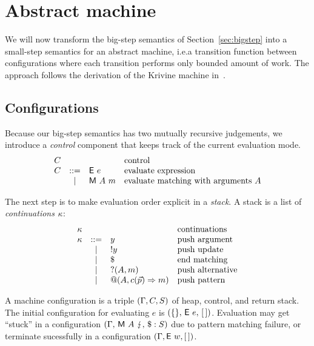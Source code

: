 \section{Abstract machine}\label{sec:smallstep}

We will now transform the big-step semantics of
Section~\ref{sec:bigstep} into a small-step semantics for an abstract
machine, i.e.\@ a transition function between configurations where
each transition performs only bounded amount of work. The approach
follows the derivation of the Krivine machine in~\cite{sestof_1997}.

\subsection{Configurations}
Because our big-step semantics has two mutually recursive judgements,
we introduce a \emph{control} component that keeps
track of the current evaluation mode.
\[ \begin{array}{lcll}
     C & && \text{control} \\
     C &::=& \textsf{E}~e & \text{evaluate expression}\\
     &\mid& \textsf{M}~A~m & \text{evaluate matching with arguments}~A 
\end{array} \]

The next step is to make evaluation order explicit 
in a \emph{stack}.  A stack is a list of \emph{continuations} $\kappa$:
\[ \begin{array}{lcll}
     \kappa &&& \text{continuations} \\
     \kappa &::=& y & \text{push argument} \\
           &\mid& !y & \text{push update} \\
           &\mid& \$ & \text{end matching} \\
           &\mid& ?(A,m) & \text{push alternative} \\
           &\mid& @(A,c(\vec{p}) \Rightarrow m) & \text{push pattern}
   \end{array}
   \]

A machine configuration is a triple
$(\Gamma,C,S)$ of heap, control, 
and return stack.  The initial configuration for evaluating $e$ is
$(\{\},\, \textsf{E}~e,\, [\,])$.  Evaluation may get ``stuck''
in a configuration
$(\Gamma,\, \textsf{M}~A~\lightning,\, \$:S)$
due to pattern matching failure, or
terminate sucessfully in a
configuration $(\Gamma, \textsf{E}~w, [\,])$.

